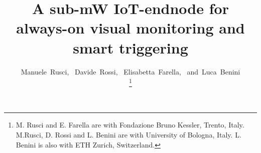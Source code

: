 \documentclass[journal]{IEEEtran}
\begin{document}
%
\title{A sub-mW IoT-endnode for always-on visual monitoring and smart triggering}
%
%
%

\author{Manuele~Rusci,~%
        Davide~Rossi,~%
        Elisabetta~Farella,~%
        and~Luca~Benini%

\thanks{M. Rusci and E. Farella are with Fondazione Bruno Kessler, Trento, Italy. M.Rusci, D. Rossi and L. Benini are with University of Bologna, Italy. L. Benini is also with ETH Zurich, Switzerland.}%
}

% 
%
\end{document}
